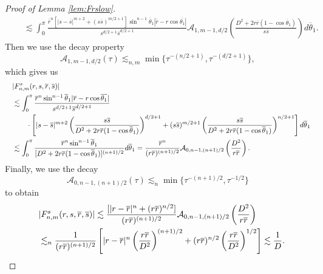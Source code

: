 \documentclass[11pt]{amsart}
\theoremstyle{definition}
\theoremstyle{remark}
\numberwithin{equation}{section}
\numberwithin{equation}{section}
\newcommand{\br}[1]{\overline{#1}}
\newcommand{\0}{\emptyset}
\newcommand{\tht}{\theta}
\newcommand{\calA}{\mathcal A}
\begin{document}
\begin{proof}[Proof of Lemma \ref{lem:Frslow}]
\begin{equation}
\begin{aligned}
				\quad&\lesssim %
				\int_{0}^{\pi}\frac{\br{r}^{n}[|s-\br{s}|^{m+2}+(s\br{s})^{m/2+1}]\sin^{n-1}\br{\tht}_{1}|\br{r}-r\cos\br{\tht_{1}}|}{s^{d/2+1}\br{s}^{d/2+1}}\calA_{1,m-1,d/2}\left(\frac{D^{2}+2r\br{r}(1-\cos\br{\tht}_{1})}{s\br{s}}\right)d\br{\tht}_{1}.
			\end{aligned}
		\end{equation}
		Then we use the decay property
		\begin{equation}
			\calA_{1,m-1,d/2}(\tau)\lesssim_{n,m} \min\{ \tau^{-(n/2+1)},\tau^{-(d/2+1)}\},
		\end{equation}
		which gives us
		\begin{equation}
			\begin{aligned}
				&|F_{n,m}^{s}(r,s,\br{r},\br{s})|\\
				\quad&\lesssim %
				\int_{0}^{\pi}\frac{\br{r}^{n}\sin^{n-1}\br{\tht}_{1}|\br{r}-r\cos\br{\tht_{1}}|}{s^{d/2+1}\br{s}^{d/2+1}}\\
				&\qquad\cdot\left[|s-\br{s}|^{m+2}\left( \frac{s\br{s}}{D^{2}+2r\br{r}(1-\cos\br{\tht}_{1})}\right)^{d/2+1}+(s\br{s})^{m/2+1} \left( \frac{s\br{s}}{D^{2}+2r\br{r}(1-\cos\br{\tht}_{1})}\right)^{n/2+1}\right]d\br{\tht}_{1}\\
				\quad&\lesssim \int_{0}^{\pi}\frac{%
					\br{r}^{n}\sin^{n-1}\br{\tht}_{1}}{[D^{2}+2r\br{r}(1-\cos\br{\tht}_{1})]^{(n+1)/2}}d\br{\tht}_{1}=\frac{\br{r}^{n}}{(r\br{r})^{(n+1)/2}}\calA_{0,n-1,(n+1)/2}\left(\frac{D^{2}}{r\br{r}}\right).
			\end{aligned}
		\end{equation}
		Finally, we use the decay
		\begin{equation}
			\calA_{0,n-1,(n+1)/2}(\tau)\lesssim_{n} \min\{ \tau^{-(n+1)/2},\tau^{-1/2}\}
		\end{equation}
		to obtain
		\begin{equation}
			\begin{aligned}
				&|F_{n,m}^{s}(r,s,\br{r},\br{s})|\lesssim %
				\frac{[|r-\br{r}|^{n}+(r\br{r})^{n/2}]}{(r\br{r})^{(n+1)/2}}\calA_{0,n-1,(n+1)/2}\left(\frac{D^{2}}{r\br{r}}\right)%
				\\
				\quad&\lesssim_{n} \frac{%
					1}{(r\br{r})^{(n+1)/2}}\left[|r-\br{r}|^{n}\left(\frac{r\br{r}}{D^{2}}\right)^{(n+1)/2}+(r\br{r})^{n/2}\left(\frac{r\br{r}}{D^{2}}\right)^{1/2}\right]\lesssim \frac{1%
				}{D}.
			\end{aligned}
		\end{equation}
	\end{proof}
\end{document}
